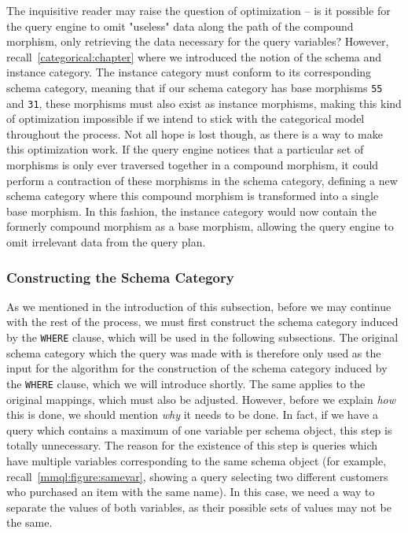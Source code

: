 The inquisitive reader may raise the question of optimization -- is it possible for the query engine to omit "useless" data along the path of the compound morphism, only retrieving the data necessary for the query variables?
However, recall~\cref{categorical:chapter} where we introduced the notion of the schema and instance category.
The instance category must conform to its corresponding schema category, meaning that if our schema category has base morphisms \texttt{55} and \texttt{31}, these morphisms must also exist as instance morphisms, making this kind of optimization impossible if we intend to stick with the categorical model throughout the process.
Not all hope is lost though, as there is a way to make this optimization work.
If the query engine notices that a particular set of morphisms is only ever traversed together in a compound morphism, it could perform a contraction of these morphisms in the schema category, defining a new schema category where this compound morphism is transformed into a single base morphism.
In this fashion, the instance category would now contain the formerly compound morphism as a base morphism, allowing the query engine to omit irrelevant data from the query plan.

\subsubsection{Constructing the Schema Category}

As we mentioned in the introduction of this subsection, before we may continue with the rest of the process, we must first construct the schema category induced by the \texttt{WHERE} clause, which will be used in the following subsections.
The original schema category which the query was made with is therefore only used as the input for the algorithm for the construction of the schema category induced by the \texttt{WHERE} clause, which we will introduce shortly.
The same applies to the original mappings, which must also be adjusted.
However, before we explain \textit{how} this is done, we should mention \textit{why} it needs to be done.
In fact, if we have a query which contains a maximum of one variable per schema object, this step is totally unnecessary.
The reason for the existence of this step is queries which have multiple variables corresponding to the same schema object (for example, recall~\cref{mmql:figure:samevar}, showing a query selecting two different customers who purchased an item with the same name).
In this case, we need a way to separate the values of both variables, as their possible sets of values may not be the same.


